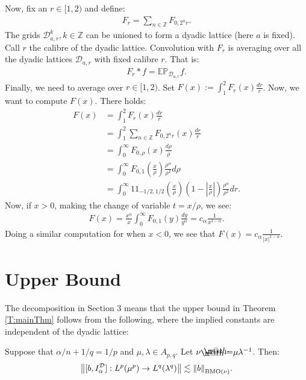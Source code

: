\documentclass[12pt]{amsart}
\begin{document}
Now, fix an $r\in [1,2)$ and define:
\begin{align*}
F_r=\sum_{n\in\mathbb{Z}}F_{0,2^{n}r}.
\end{align*}
The grids ${\mathcal{{D}}}_{a,r}^{k},k\in\mathbb{Z}$ 
can be unioned to form a dyadic lattice (here $a$ is fixed).
Call $r$ the calibre of the dyadic lattice. Convolution 
with $F_r$ is averaging over all the dyadic lattices
${\mathcal{{D}}}_{a,r}$ with fixed calibre $r$. That is:
\begin{align*}
F_r\ast f = \mathbb{E}\mathbb{P}_{{\mathcal{{D}}}_{a,r}}f.
\end{align*}
Finally, we need to average over $r\in[1,2)$. Set
$F(x):=\int_{1}^{2}F_r(x)\frac{dr}{r}$. Now, 
we want to compute $F(x)$. There holds:
\begin{align*}
F(x)
&=\int_{1}^{2}F_r(x)\frac{dr}{r}
\\&=\int_{1}^{2}\sum_{n\in\mathbb{Z}}F_{0,2^{n}r}(x)\frac{dr}{r}
\\&=\int_{0}^{\infty}F_{0,\rho}(x)\frac{d\rho}{\rho}
\\&=\int_{0}^{\infty}F_{0,1}(\frac{x}{\rho})\frac{\rho^\alpha}{\rho^2}d\rho
\\&=\int_{0}^{\infty}{1\!\!1}_{-1/2,1/2}(\frac{x}{\rho})
  (1-{\ensuremath{\left\vert{\frac{x}{\rho}}\right\vert}})
  \frac{\rho^\alpha}{\rho^2}dr.
\end{align*}
Now, if $x>0$, making the change of variable $t=x/\rho$, we see:
\begin{align*}
F(x)=\frac{x^\alpha}{x}\int_{0}^{\infty}F_{0,1}(y)\frac{dy}{y^\alpha}
=c_\alpha\frac{1}{x^{1-\alpha}}.
\end{align*}
Doing a similar computation for when $x<0$, we see that
$F(x)=c_\alpha \frac{1}{{\ensuremath{\left\vert{x}\right\vert}}^{1-\alpha}}$. 

\section{Upper Bound}
The decomposition in Section 3 
means that the upper bound in Theorem \ref{T:mainThm} 
follows from the following, where the implied 
constants are independent of the dyadic lattice:
\begin{lm} \label{T:mainLem}
Suppose that $\alpha/n+1/q=1/p$ and $\mu, {\lambda} \in A_{p,q}$. Let $\nu {\mathrel{\rlap{                     \raisebox{0.3ex}{$\m@th\cdot$}}                     \raisebox{-0.3ex}{$\m@th\cdot$}}                     =} \mu{\lambda}^{-1}$. Then:
\begin{align*}
{\ensuremath{\left\|{[b,{I_{\alpha}^{{\mathcal{{D}}}}}]:L^p(\mu^p)\to L^q({\lambda}^q)}\right\|}}
\lesssim
{\ensuremath{\left\|{b}\right\|}}_{{\textnormal{BMO}}(\nu)}.
\end{align*}
\end{lm}
\end{document}
